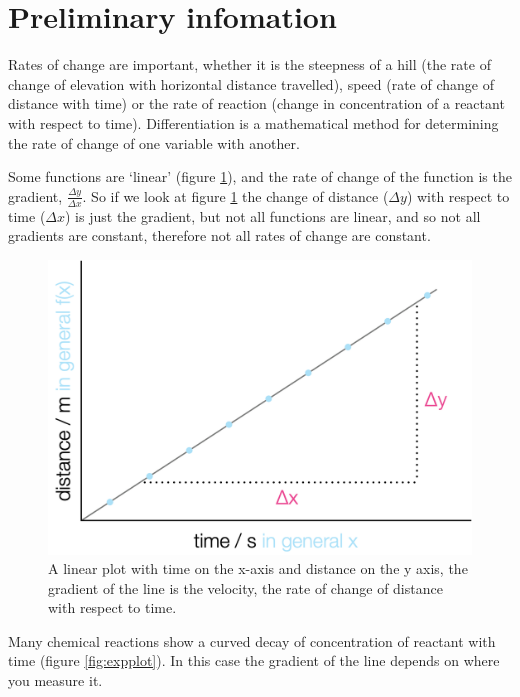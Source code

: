 \documentclass[
]{book}
\begin{document}
\hypertarget{sec:Prelim4}{%
\section{Preliminary infomation}\label{sec:Prelim4}}

Rates of change are important, whether it is the steepness of a hill (the rate of change of elevation with horizontal distance travelled), speed (rate of change of distance with time) or the rate of reaction (change in concentration of a reactant with respect to time). Differentiation is a mathematical method for determining the rate of change of one variable with another.

Some functions are `linear' (figure \ref{fig:linear}), and the rate of change of the function is the gradient, \(\frac{\Delta y}{\Delta x}\). So if we look at figure \ref{fig:linear} the change of distance (\(\Delta y\)) with respect to time (\(\Delta x\)) is just the gradient, but not all functions are linear, and so not all gradients are constant, therefore not all rates of change are constant.

\begin{figure}

{\centering \includegraphics[width=0.5\linewidth]{images/linearplot} 

}

\caption{A linear plot with time on the x-axis and distance on the y axis, the gradient of the line is the velocity, the rate of change of distance with respect to time.}\label{fig:linear}
\end{figure}

Many chemical reactions show a curved decay of concentration of reactant with time (figure \ref{fig:expplot}). In this case the gradient of the line depends on where you measure it.
\end{document}
